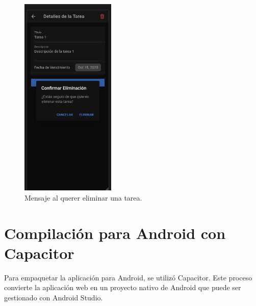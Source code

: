 \documentclass{article}
\begin{document}
\begin{figure}[htbp]
\centering
\includegraphics[width=0.4\textwidth]{captura_eliminar.png}
\caption{Mensaje al querer eliminar una tarea.}
\label{fig:eliminar}
\end{figure}


\section{Compilaci\'on para Android con Capacitor}
Para empaquetar la aplicaci\'on para Android, se utiliz\'o Capacitor. Este proceso convierte la aplicaci\'on web en un proyecto nativo de Android que puede ser gestionado con Android Studio.
\end{document}
